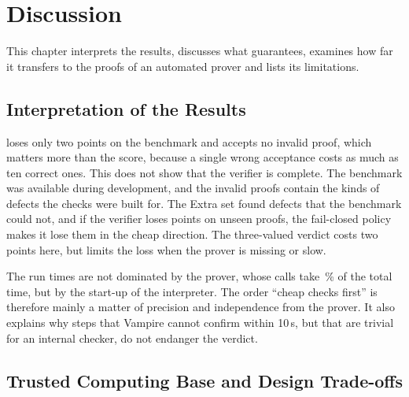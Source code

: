 \section{Discussion}
\label{sec:discussion}

This chapter interprets the results, discusses what \TSTPy{} guarantees, examines how far it transfers to the proofs of an automated prover and lists its limitations.

\subsection{Interpretation of the Results}
\label{subsec:disc-results}

\TSTPy{} loses only two points on the benchmark and accepts no invalid proof, which matters more than the score, because a single wrong acceptance costs as much as ten correct ones.
This does not show that the verifier is complete.
The benchmark was available during development, and the invalid proofs contain the kinds of defects the checks were built for.
The Extra set found defects that the benchmark could not, and if the verifier loses points on unseen proofs, the fail-closed policy makes it lose them in the cheap direction.
The three-valued verdict costs two points here, but limits the loss when the prover is missing or slow.

The run times are not dominated by the prover, whose calls take \EvalAtpShare\,\% of the total time, but by the start-up of the interpreter.
The order ``cheap checks first'' is therefore mainly a matter of precision and independence from the prover.
It also explains why steps that Vampire cannot confirm within 10\,s, but that are trivial for an internal checker, do not endanger the verdict.

\subsection{Trusted Computing Base and Design Trade-offs}
\label{subsec:disc-tcb}

